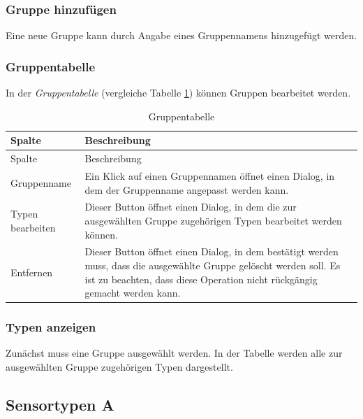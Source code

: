 \documentclass[
]{article}
\begin{document}
\hypertarget{gruppe-hinzufuxfcgen}{%
\subsubsection{Gruppe hinzufügen}\label{gruppe-hinzufuxfcgen}}

Eine neue Gruppe kann durch Angabe eines Gruppennamens hinzugefügt werden.

\hypertarget{gruppentabelle}{%
\subsubsection{Gruppentabelle}\label{gruppentabelle}}

In der \emph{Gruppentabelle} (vergleiche Tabelle \ref{tab:group-table}) können Gruppen bearbeitet werden.

\begin{longtable}[]{@{}
  >{\raggedright\arraybackslash}p{}
  >{\raggedright\arraybackslash}p{}@{}}
\caption{\label{tab:group-table} Gruppentabelle}\tabularnewline
\toprule
Spalte & Beschreibung \\
\midrule
\endfirsthead
\toprule
Spalte & Beschreibung \\
\midrule
\endhead
Gruppenname & Ein Klick auf einen Gruppennamen öffnet einen Dialog, in dem der Gruppenname angepasst werden kann. \\
Typen bearbeiten & Dieser Button öffnet einen Dialog, in dem die zur ausgewählten Gruppe zugehörigen Typen bearbeitet werden können. \\
Entfernen & Dieser Button öffnet einen Dialog, in dem bestätigt werden muss, dass die ausgewählte Gruppe gelöscht werden soll. Es ist zu beachten, dass diese Operation nicht rückgängig gemacht werden kann. \\
\bottomrule
\end{longtable}

\hypertarget{typen-anzeigen}{%
\subsubsection{Typen anzeigen}\label{typen-anzeigen}}

Zunächst muss eine Gruppe ausgewählt werden. In der Tabelle werden alle zur ausgewählten Gruppe zugehörigen Typen dargestellt.

\hypertarget{type}{%
\subsection{Sensortypen A}\label{type}}
\end{document}
